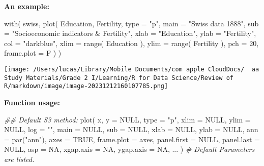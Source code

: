 \documentclass[
]{article}
\let\oldincludegraphics\includegraphics
\renewcommand{\includegraphics}[2][]{\begin{center}\oldincludegraphics[#1]{#2}\end{center}}
\newenvironment{Shaded}{}{}
\newcommand{\AttributeTok}[1]{\textcolor[rgb]{0.49,0.56,0.16}{#1}}
\newcommand{\CommentTok}[1]{\textcolor[rgb]{0.38,0.63,0.69}{\textit{#1}}}
\newcommand{\ConstantTok}[1]{\textcolor[rgb]{0.53,0.00,0.00}{#1}}
\newcommand{\DecValTok}[1]{\textcolor[rgb]{0.25,0.63,0.44}{#1}}
\newcommand{\DocumentationTok}[1]{\textcolor[rgb]{0.73,0.13,0.13}{\textit{#1}}}
\newcommand{\FunctionTok}[1]{\textcolor[rgb]{0.02,0.16,0.49}{#1}}
\newcommand{\NormalTok}[1]{#1}
\newcommand{\StringTok}[1]{\textcolor[rgb]{0.25,0.44,0.63}{#1}}
\begin{document}
\textbf{An example:}

\begin{Shaded}
\begin{Highlighting}[]
\FunctionTok{with}\NormalTok{( }
\NormalTok{  swiss, }
  \FunctionTok{plot}\NormalTok{(}
\NormalTok{    Education, }
\NormalTok{    Fertility,}
    \AttributeTok{type =} \StringTok{"p"}\NormalTok{, }
    \AttributeTok{main =} \StringTok{"Swiss data 1888"}\NormalTok{, }
    \AttributeTok{sub =} \StringTok{"Socioeconomic indicators \& Fertility"}\NormalTok{, }
    \AttributeTok{xlab =} \StringTok{"Education"}\NormalTok{, }
    \AttributeTok{ylab =} \StringTok{"Fertility"}\NormalTok{, }
    \AttributeTok{col =} \StringTok{"darkblue"}\NormalTok{, }
    \AttributeTok{xlim =} \FunctionTok{range}\NormalTok{( Education ), }
    \AttributeTok{ylim =} \FunctionTok{range}\NormalTok{( Fertility ), }
    \AttributeTok{pch =} \DecValTok{20}\NormalTok{, }
    \AttributeTok{frame.plot =}\NormalTok{ F}
\NormalTok{  ) }
\NormalTok{)}
\end{Highlighting}
\end{Shaded}

\texttt{[image: /Users/lucas/Library/Mobile Documents/com~apple~CloudDocs/~~aa Study Materials/Grade 2 I/Learning/R for Data Science/Review of R/markdown/image/image-20231212160107785.png]}

\textbf{Function usage:}

\begin{Shaded}
\begin{Highlighting}[]
\DocumentationTok{\#\# Default S3 method:}
\FunctionTok{plot}\NormalTok{(}
\NormalTok{  x, }
  \AttributeTok{y =} \ConstantTok{NULL}\NormalTok{, }
  \AttributeTok{type =} \StringTok{"p"}\NormalTok{, }
  \AttributeTok{xlim =} \ConstantTok{NULL}\NormalTok{, }\AttributeTok{ylim =} \ConstantTok{NULL}\NormalTok{,}
  \AttributeTok{log =} \StringTok{""}\NormalTok{, }
  \AttributeTok{main =} \ConstantTok{NULL}\NormalTok{, }\AttributeTok{sub =} \ConstantTok{NULL}\NormalTok{, }
  \AttributeTok{xlab =} \ConstantTok{NULL}\NormalTok{, }\AttributeTok{ylab =} \ConstantTok{NULL}\NormalTok{,}
  \AttributeTok{ann =} \FunctionTok{par}\NormalTok{(}\StringTok{"ann"}\NormalTok{), }\AttributeTok{axes =} \ConstantTok{TRUE}\NormalTok{, }\AttributeTok{frame.plot =}\NormalTok{ axes,}
  \AttributeTok{panel.first =} \ConstantTok{NULL}\NormalTok{, }\AttributeTok{panel.last =} \ConstantTok{NULL}\NormalTok{, }\AttributeTok{asp =} \ConstantTok{NA}\NormalTok{,}
  \AttributeTok{xgap.axis =} \ConstantTok{NA}\NormalTok{, }\AttributeTok{ygap.axis =} \ConstantTok{NA}\NormalTok{,}
\NormalTok{  ...}
\NormalTok{)}
\CommentTok{\# Default Parameters are listed.}
\end{Highlighting}
\end{Shaded}
\end{document}
